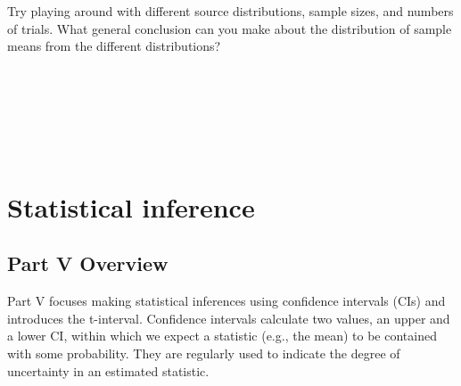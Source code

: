 \documentclass[
  openany]{scrbook}
\begin{document}
\begin{verbatim}






\end{verbatim}

Try playing around with different source distributions, sample sizes, and numbers of trials.
What general conclusion can you make about the distribution of sample means from the different distributions?

\begin{verbatim}






\end{verbatim}

\hypertarget{part-statistical-inference}{%
\part{Statistical inference}\label{part-statistical-inference}}

\hypertarget{Week5}{%
\chapter*{Part V Overview}\label{Week5}}

Part V focuses making statistical inferences using confidence intervals (CIs) and introduces the t-interval.
Confidence intervals calculate two values, an upper and a lower CI, within which we expect a statistic (e.g., the mean) to be contained with some probability.
They are regularly used to indicate the degree of uncertainty in an estimated statistic.
\end{document}

